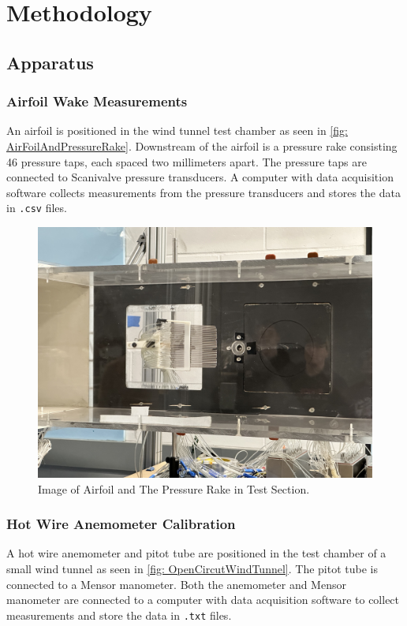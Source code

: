 \chapter{Methodology}
\label{cp:methodology}

\section{Apparatus}\label{sec:apparatus}
\subsection{Airfoil Wake Measurements}
An airfoil is positioned in the wind tunnel test chamber as seen in \autoref{fig: AirFoilAndPressureRake}. Downstream of the airfoil is a pressure rake consisting \num{46} pressure taps, each spaced two millimeters apart. The pressure taps are connected to Scanivalve pressure transducers. A computer with data acquisition software collects measurements from the pressure transducers and stores the data in \verb|.csv| files.

\begin{figure}[htpb]
    \centering
    \includegraphics[width=0.75\linewidth]{Figures/IMG_3196.jpeg}
    \caption[Image of Airfoil and The Pressure Rake in Test Section.]{Image of Airfoil and The Pressure Rake in Test Section.}
    \label{fig: AirFoilAndPressureRake}
\end{figure}

\subsection{Hot Wire Anemometer Calibration}
A hot wire anemometer and pitot tube are positioned in the test chamber of a small wind tunnel as seen in \autoref{fig: OpenCircutWindTunnel}. The pitot tube is connected to a Mensor manometer. Both the anemometer and Mensor manometer are connected to a computer with data acquisition software to collect measurements and store the data in \verb|.txt| files. 

